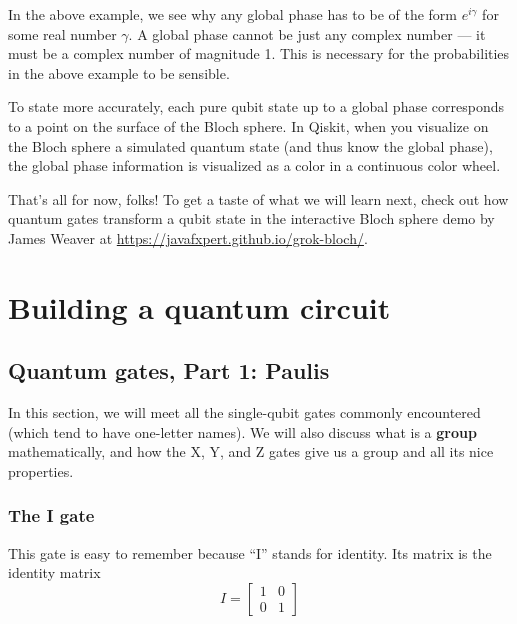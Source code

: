 \documentclass{article}
\theoremstyle{definition}
\begin{document}
In the above example, we see why any global phase has to be of the form $e^{i \gamma}$ for some real number $\gamma$.  A global phase cannot be just any complex number --- it must be a complex number of magnitude 1.  This is necessary for the probabilities in the above example to be sensible.

To state more accurately, each pure qubit state up to a global phase corresponds to a point on the surface of the Bloch sphere.  In Qiskit, when you visualize on the Bloch sphere a simulated quantum state (and thus know the global phase), the global phase information is visualized as a color in a continuous color wheel.

That's all for now, folks!
To get a taste of what we will learn next, check out how quantum gates transform a qubit state in the interactive Bloch sphere demo by James Weaver at \url{https://javafxpert.github.io/grok-bloch/}.

\newpage

\section{Building a quantum circuit}

\subsection{Quantum gates, Part 1: Paulis}
In this section, we will meet all the single-qubit gates commonly encountered (which tend to have one-letter names).
We will also discuss what is a \textbf{group} mathematically, and how the X, Y, and Z gates give us a group and all its nice properties.

\subsubsection{The I gate}
This gate is easy to remember because ``I'' stands for identity.
Its matrix is the identity matrix
\begin{equation}
	I = \begin{bmatrix}
		1 & 0\\
		0 & 1
	\end{bmatrix}
\end{equation}
\end{document}
